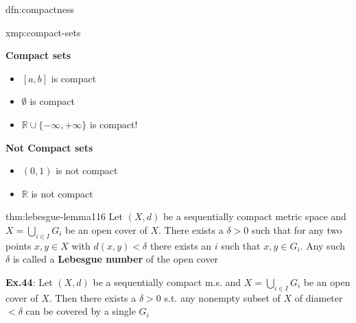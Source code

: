 \documentclass[landscape, 8pt]{extarticle}
\begin{document}
\begin{multicols}{3}
\begin{dfn}{dfn:compactness}{}
\end{dfn}

\begin{xmp}{xmp:compact-sets}{}
    \vspace{-16pt}
    \setlength{\columnseprule}{0.5pt}
    \begin{multicols}{2}
        \textbf{Compact sets}
        \vspace{-5pt}
        \begin{itemize}[leftmargin=*]
            \item $[a, b]$ is compact
            \item $\emptyset$ is compact
            \item $\mathbb{R} \cup \{-\infty, +\infty\}$ is compact!
        \end{itemize}

        \textbf{Not Compact sets}
        \vspace{-5pt}
        \begin{itemize}[leftmargin=*]
            \item $(0, 1)$ is not compact
            \item $\mathbb{R}$ is not compact
        \end{itemize}
    \end{multicols}
    \vspace{-8pt}
\end{xmp}

\vspace{-6pt}
\begin{thm}{thm:lebesgue-lemma}{116}
    \vspace{-6pt}
    Let $(X, d)$ be a sequentially compact metric space and $X = \bigcup_{i\in I} G_{i}$ be an open cover of $X$. There exists a $\delta > 0$ such that for any two points $x, y\in X$ with $d(x, y) < \delta$ there exists an $i$ such that $x, y\in G_{i}$. Any such $\delta$ is called a \textbf{Lebesgue number} of the open cover

    \longrule{0.08ex}
    \textbf{Ex.44}: Let $(X, d)$ be a sequentially compact m.s. and $X = \bigcup_{i\in I} G_{i}$ be an open cover of $X$. Then there exists a $\delta > 0$ s.t. any nonempty subset of $X$ of diameter $< \delta$ can be covered by a single $G_{i}$
\end{thm}


\end{multicols}
\end{document}
